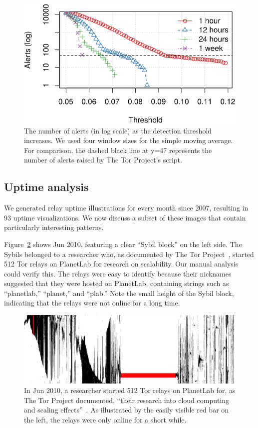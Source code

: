 \begin{figure}[t]
	\centering
	\includegraphics[width=\linewidth]{diagrams/threshold-alarm.pdf}
	\caption{The number of alerts (in log scale) as the detection threshold
	increases.  We used four window sizes for the simple moving average.  For
	comparison, the dashed black line at y=47 represents the number of alerts
	raised by The Tor Project's script.}
	\label{fig:threshold-alarm}
\end{figure}

\subsection{Uptime analysis}
\label{sec:uptime}
We generated relay uptime illustrations for every month since 2007, resulting in
93 uptime visualizations.  We now discuss a subset of these images that contain
particularly interesting patterns.

Figure~\ref{fig:2010-06-planetlab} shows Jun 2010, featuring a clear ``Sybil
block'' on the left side.  The Sybils belonged to a researcher who, as
documented by The Tor Project~\cite{progressreport}, started 512 Tor relays on
PlanetLab for research on scalability.  Our manual analysis could verify this.
The relays were easy to identify because their nicknames suggested that they
were hosted on PlanetLab, containing strings such as ``planetlab,'' ``planet,''
and ``plab.''  Note the small height of the Sybil block, indicating that the
relays were not online for a long time.

\begin{figure}[t]
	\centering
	\includegraphics[width=\linewidth]{diagrams/2010-06.jpg}
	\caption{In Jun 2010, a researcher started 512 Tor relays on PlanetLab for,
		as The Tor Project documented, ``their research into cloud computing and
		scaling effects''~\cite{progressreport}.  As illustrated by the easily
		visible red bar on the left, the relays were only online for a short
		while.}
	\label{fig:2010-06-planetlab}
\end{figure}


